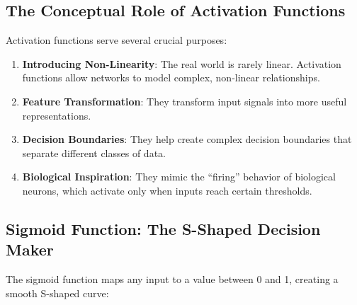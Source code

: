 \documentclass[
  letterpaper,
  DIV=11,
  numbers=noendperiod]{scrreprt}
\begin{document}
\subsection{The Conceptual Role of Activation
Functions}\label{the-conceptual-role-of-activation-functions}

Activation functions serve several crucial purposes:

\begin{enumerate}
\def\labelenumi{\arabic{enumi}.}
\item
  \textbf{Introducing Non-Linearity}: The real world is rarely linear.
  Activation functions allow networks to model complex, non-linear
  relationships.
\item
  \textbf{Feature Transformation}: They transform input signals into
  more useful representations.
\item
  \textbf{Decision Boundaries}: They help create complex decision
  boundaries that separate different classes of data.
\item
  \textbf{Biological Inspiration}: They mimic the ``firing'' behavior of
  biological neurons, which activate only when inputs reach certain
  thresholds.
\end{enumerate}

\subsection{Sigmoid Function: The S-Shaped Decision
Maker}\label{sigmoid-function-the-s-shaped-decision-maker}

The sigmoid function maps any input to a value between 0 and 1, creating
a smooth S-shaped curve:
\end{document}
